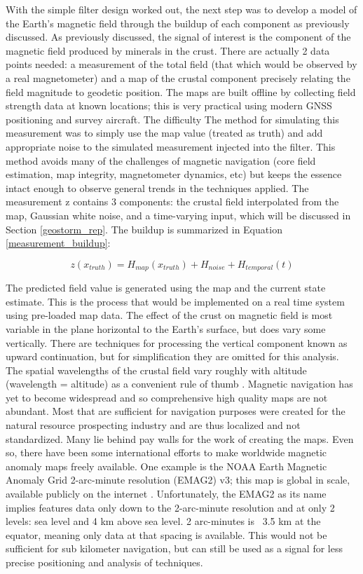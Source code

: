 \documentclass[conf]{new-aiaa}
\begin{document}
With the simple filter design worked out, the next step was to develop a model of the Earth's magnetic field through the buildup of each component as previously discussed. As previously discussed, the signal of interest is the component of the magnetic field produced by minerals in the crust. There are actually 2 data points needed: a measurement of the total field (that which would be observed by a real magnetometer) and a map of the crustal component precisely relating the field magnitude to geodetic position. The maps are built offline by collecting field strength data at known locations; this is very practical using modern GNSS positioning and survey aircraft. The difficulty  The method for simulating this measurement was to simply use the map value (treated as truth) and add appropriate noise to the simulated measurement injected into the filter. This method avoids many of the challenges of magnetic navigation (core field estimation, map integrity, magnetometer dynamics, etc) but keeps the essence intact enough to observe general trends in the techniques applied. The measurement z contains 3 components: the crustal field interpolated from the map, Gaussian white noise, and a time-varying input, which will be discussed in Section \ref{geostorm_rep}. The buildup is summarized in Equation \ref{measurement_buildup}:

\begin{equation} \label{measurement_buildup}
    z(x_{ truth}) = H_{map}(x_{ truth}) + H_{noise} + H_{temporal}(t)
\end{equation}

The predicted field value is generated using the map and the current state estimate. This is the process that would be implemented on a real time system using pre-loaded map data. The effect of the crust on magnetic field is most variable in the plane horizontal to the Earth's surface, but does vary some vertically. There are techniques for processing the vertical component known as upward continuation, but for simplification they are omitted for this analysis. The spatial wavelengths of the crustal field vary roughly with altitude (wavelength = altitude) as a convenient rule of thumb \cite{Absolute_Positioning_Using_the_Earths_Magnetic_Anomaly_Field}. Magnetic navigation has yet to become widespread and so comprehensive high quality maps are not abundant. Most that are sufficient for navigation purposes were created for the natural resource prospecting industry and are thus localized and not standardized. Many lie behind pay walls for the work of creating the maps. Even so, there have been some international efforts to make worldwide magnetic anomaly maps freely available. One example is the NOAA Earth Magnetic Anomaly Grid 2-arc-minute resolution (EMAG2) v3; this map is global in scale, available publicly on the internet \cite{noaa_emag2}. Unfortunately, the EMAG2 as its name implies features data only down to the 2-arc-minute resolution and at only 2 levels: sea level and 4 km above sea level. 2 arc-minutes is ~3.5 km at the equator, meaning only data at that spacing is available. This would not be sufficient for sub kilometer navigation, but can still be used as a signal for less precise positioning and analysis of techniques.
\end{document}
